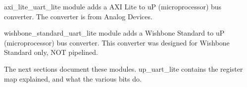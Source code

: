 \par
axi\_lite\_uart\_lite module adds a AXI Lite to uP (microprocessor) bus converter. The converter is
from Analog Devices.

\par
wishbone\_standard\_uart\_lite module adds a Wishbone Standard to uP (microprocessor) bus converter. This
converter was designed for Wishbone Standard only, NOT pipelined.

\vspace{15mm}
\par
The next sections document these modules. up\_uart\_lite contains the register map explained, and what the various bits do.

